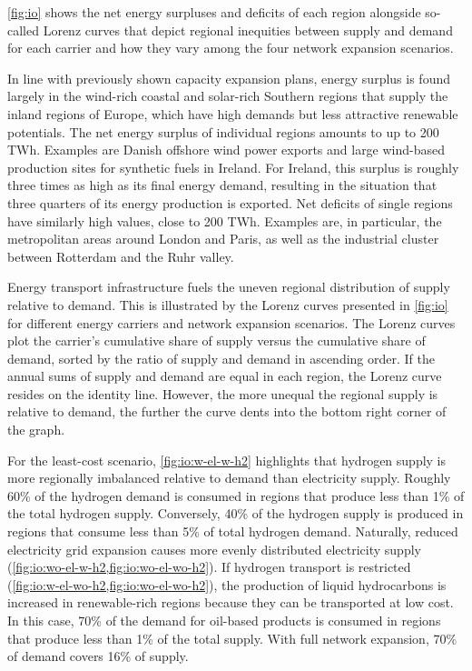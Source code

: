 \cref{fig:io} shows the net energy surpluses and deficits of each region
alongside so-called Lorenz curves that depict regional inequities between supply
and demand for each carrier and how they vary among the four network expansion
scenarios.

In line with previously shown capacity expansion plans, energy surplus is found
largely in the wind-rich coastal and solar-rich Southern regions that supply the
inland regions of Europe, which have high demands but less attractive renewable
potentials. The net energy surplus of individual regions amounts to up to 200
TWh. Examples are Danish offshore wind power exports and large wind-based
production sites for synthetic fuels in Ireland. For Ireland, this surplus is
roughly three times as high as its final energy demand, resulting in the
situation that three quarters of its energy production is exported. Net deficits
of single regions have similarly high values, close to 200 TWh. Examples are, in
particular, the metropolitan areas around London and Paris, as well as the
industrial cluster between Rotterdam and the Ruhr valley.

Energy transport infrastructure fuels the uneven regional distribution of supply
relative to demand. This is illustrated by the Lorenz curves presented in
\cref{fig:io} for different energy carriers and network expansion scenarios. The
Lorenz curves plot the carrier's cumulative share of supply versus the
cumulative share of demand, sorted by the ratio of supply and demand in
ascending order. If the annual sums of supply and demand are equal in each
region, the Lorenz curve resides on the identity line. However, the more unequal
the regional supply is relative to demand, the further the curve dents into the
bottom right corner of the graph.

For the least-cost scenario, \cref{fig:io:w-el-w-h2} highlights that hydrogen
supply is more regionally imbalanced relative to demand than electricity supply.
Roughly 60\% of the hydrogen demand is consumed in regions that produce less
than 1\% of the total hydrogen supply. Conversely, 40\% of the hydrogen supply
is produced in regions that consume less than 5\% of total hydrogen demand.
Naturally, reduced electricity grid expansion causes more evenly distributed
electricity supply (\cref{fig:io:wo-el-w-h2,fig:io:wo-el-wo-h2}). If hydrogen
transport is restricted (\cref{fig:io:w-el-wo-h2,fig:io:wo-el-wo-h2}), the
production of liquid hydrocarbons is increased in renewable-rich regions because
they can be transported at low cost. In this case, 70\% of the demand for
oil-based products is consumed in regions that produce less than 1\% of the
total supply. With full network expansion, 70\% of demand covers 16\% of supply.


